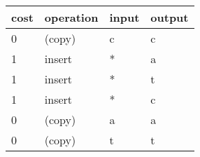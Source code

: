 \documentclass[aspectratio=169]{beamer}
\begin{document}
\begin{frame}[shrink=15]
\vfill

\bigskip

\begin{tabular}{ll||l|l}
cost & operation & input & output\\\hline\hline
0 & (copy)  &c&c\\\hline
1 & insert  &*&a\\\hline
1 & insert  &*&t\\\hline
1 & insert  &*&c\\\hline
0 & (copy)  &a&a\\\hline
0 & (copy)  &t&t\\\hline

\end{tabular}
\end{frame}
\end{document}
